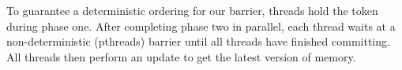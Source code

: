 To guarantee a deterministic ordering for our barrier, threads hold the token during phase one. %
 After completing phase two in parallel, each thread waits at a non-deterministic (pthreads) barrier until all threads have finished committing. All threads then perform an update to get the latest version of memory.




